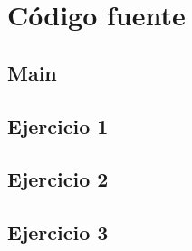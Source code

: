 \documentclass{article}
\theoremstyle{definition}
\theoremstyle{remark}
\begin{document}
\pagebreak

\section{Código fuente}

\subsection{Main}
%

\subsection{Ejercicio 1}
%
%

\subsection{Ejercicio 2}
%
%

\subsection{Ejercicio 3}
%
%
\end{document}
